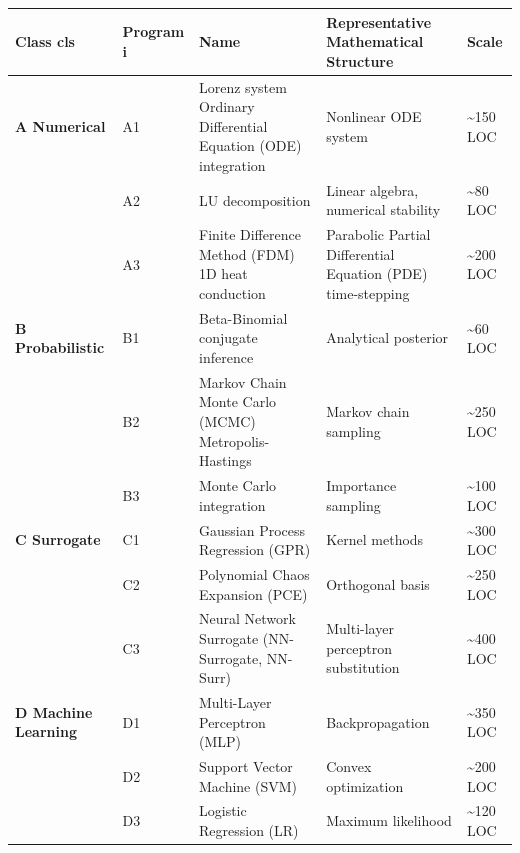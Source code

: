 \documentclass[review,12pt,authoryear]{elsarticle}
\begin{document}
{\def\LTcaptype{none} %
\begin{longtable}[]{@{}
  >{\raggedright\arraybackslash}p{}
  >{\raggedright\arraybackslash}p{}
  >{\raggedright\arraybackslash}p{}
  >{\raggedright\arraybackslash}p{}
  >{\raggedright\arraybackslash}p{}@{}}
\toprule\noalign{}
\begin{minipage}[b]{\linewidth}\raggedright
Class cls
\end{minipage} & \begin{minipage}[b]{\linewidth}\raggedright
Program i
\end{minipage} & \begin{minipage}[b]{\linewidth}\raggedright
Name
\end{minipage} & \begin{minipage}[b]{\linewidth}\raggedright
Representative Mathematical Structure
\end{minipage} & \begin{minipage}[b]{\linewidth}\raggedright
Scale
\end{minipage} \\
\midrule\noalign{}
\endhead
\bottomrule\noalign{}
\endlastfoot
\textbf{A Numerical} & A1 & Lorenz system Ordinary Differential Equation
(ODE) integration & Nonlinear ODE system & \textasciitilde150 LOC \\
& A2 & LU decomposition & Linear algebra, numerical stability &
\textasciitilde80 LOC \\
& A3 & Finite Difference Method (FDM) 1D heat conduction & Parabolic
Partial Differential Equation (PDE) time-stepping & \textasciitilde200
LOC \\
\textbf{B Probabilistic} & B1 & Beta-Binomial conjugate inference &
Analytical posterior & \textasciitilde60 LOC \\
& B2 & Markov Chain Monte Carlo (MCMC) Metropolis-Hastings & Markov
chain sampling & \textasciitilde250 LOC \\
& B3 & Monte Carlo integration & Importance sampling &
\textasciitilde100 LOC \\
\textbf{C Surrogate} & C1 & Gaussian Process Regression (GPR) & Kernel
methods & \textasciitilde300 LOC \\
& C2 & Polynomial Chaos Expansion (PCE) & Orthogonal basis &
\textasciitilde250 LOC \\
& C3 & Neural Network Surrogate (NN-Surrogate, NN-Surr) & Multi-layer
perceptron substitution & \textasciitilde400 LOC \\
\textbf{D Machine Learning} & D1 & Multi-Layer Perceptron (MLP) &
Backpropagation & \textasciitilde350 LOC \\
& D2 & Support Vector Machine (SVM) & Convex optimization &
\textasciitilde200 LOC \\
& D3 & Logistic Regression (LR) & Maximum likelihood &
\textasciitilde120 LOC \\
\end{longtable}
}
\end{document}
